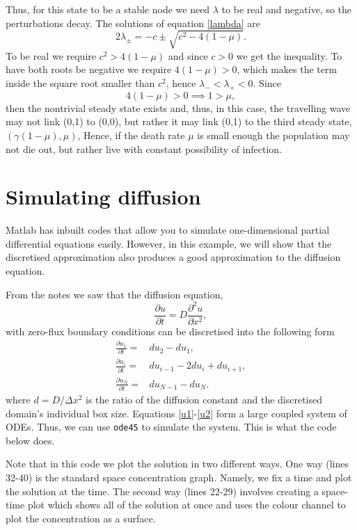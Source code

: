 \documentclass[10pt]{article}
\newcommand{\bb}{\begin{equation}}
\newcommand{\ee}{\end{equation}}
\newcommand{\D}[2]{\frac{\partial #1}{\partial #2}}
\newcommand{\DD}[2]{\frac{\partial^2 #1}{\partial #2^2}}
\newcommand{\eqn}[1]{equation \eqref{#1}}
\begin{document}
\begin{Answ}
\begin{enumerate}
Thus, for this state to be a stable node we need $\lambda$ to be real and negative, so the perturbations decay. The solutions of \eqn{lambda} are
\bb
2\lambda_\pm=-c\pm\sqrt{c^2-4(1-\mu)}.
\ee
To be real we require $c^2>4(1-\mu)$ and since $c>0$ we get the inequality. To have both roots be negative we require $4(1-\mu)>0$, which makes the term inside the square root smaller than $c^2$, hence $\lambda_-<\lambda_+<0$. Since 
\bb
4(1-\mu)>0 \implies 1>\mu,
\ee
then the nontrivial steady state exists and, thus, in this case, the travelling wave may not link (0,1) to (0,0), but rather it may link (0,1) to the third steady state, $(\gamma(1-\mu),\mu)$, Hence, if the death rate $\mu$ is small enough the population may not die out, but rather live with constant possibility of infection.

\end{enumerate}
\end{Answ}




\section{Simulating diffusion}
Matlab has inbuilt codes that allow you to simulate one-dimensional partial differential equations easily. However, in this example, we will show that the discretised approximation also produces a good approximation to the diffusion equation.

From the notes we saw that the diffusion equation,
\bb
\D{u}{t}=D\DD{u}{x},
\ee
 with zero-flux boundary conditions can be discretised into the following form
\begin{align}
\D{u_1}{t}=&du_{2}-du_1,\label{u1}\\
\D{u_i}{t}=&du_{i-1}-2du_i+du_{i+1},\\
\D{u_N}{t}=&du_{N-1}-du_N\label{u2}.
\end{align}
where $d=D/\Delta x^2$ is the ratio of the diffusion constant and the discretised domain's individual box size. Equations \eqref{u1}-\eqref{u2} form a large coupled system of ODEs. Thus, we can use \texttt{ode45} to simulate the system. This is what the code below does.

Note that in this code we plot the solution in two different ways. One way (lines 32-40) is the standard space concentration graph. Namely, we fix a time and plot the solution at the time. The second way (lines 22-29) involves creating a space-time plot which shows all of the solution at once and uses the colour channel to plot the concentration as a surface.
\end{document}
